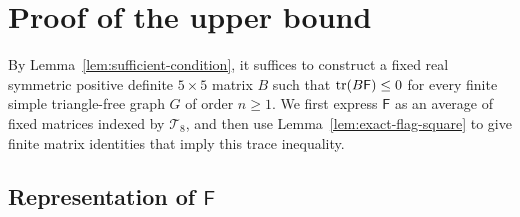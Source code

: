 \section{Proof of the upper bound}
\label{sec:proof}

By Lemma~\ref{lem:sufficient-condition}, it suffices to construct a
fixed real symmetric positive definite $5\times5$ matrix $B$ such that
$\operatorname{tr}(B\mathsf F)\leq0$ for every finite simple triangle-free graph $G$
of order $n\geq1$.
We first express $\mathsf F$ as an average of fixed matrices indexed by
$\mathcal T_8$, and then use Lemma~\ref{lem:exact-flag-square} to give
finite matrix identities that imply this trace inequality.

\subsection{Representation of \texorpdfstring{$\mathsf F$}{F}}
\label{subsec:F-representation}

